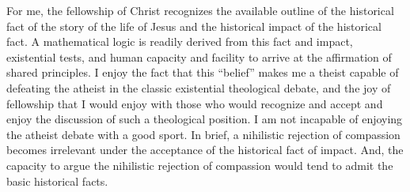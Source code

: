 

For me, the fellowship of Christ recognizes the available outline of
the historical fact of the story of the life of Jesus and the
historical impact of the historical fact.  A mathematical logic is
readily derived from this fact and impact, existential tests, and
human capacity and facility to arrive at the affirmation of shared
principles.  I enjoy the fact that this ``belief'' makes me a theist
capable of defeating the atheist in the classic existential
theological debate, and the joy of fellowship that I would enjoy with
those who would recognize and accept and enjoy the discussion of such
a theological position.  I am not incapable of enjoying the atheist
debate with a good sport.  In brief, a nihilistic rejection of
compassion becomes irrelevant under the acceptance of the historical
fact of impact.  And, the capacity to argue the nihilistic rejection
of compassion would tend to admit the basic historical facts.

\bye
